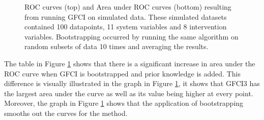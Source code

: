 \documentclass[a4paper,pdf]{article}
\begin{document}
\begin{figure}[!ht]
    \centering   
    \renewcommand{\arraystretch}{2}
    \setlength{\tabcolsep}{7pt}
    \caption{ROC curves (top) and Area under ROC curves (bottom) resulting from running GFCI on simulated data. These simulated datasets contained 100 datapoints, 11 system variables and 8 intervention variables. Bootstrapping occurred by running the same algorithm on random subsets of data 10 times and averaging the results. \label{fig:simgraphgfci}}
\end{figure}

\newpage %
The table in Figure \ref{fig:simgraphgfci} shows that there is a significant increase in area under the ROC curve when GFCI is bootstrapped and prior knowledge is added. This difference is visually illustrated in the graph in Figure \ref{fig:simgraphgfci}, it shows that GFCI3 has the largest area under the curve as well as its value being higher at every point. Moreover, the graph in Figure \ref{fig:simgraphgfci} shows that the application of bootstrapping smooths out the curves for the method. 
\end{document}
